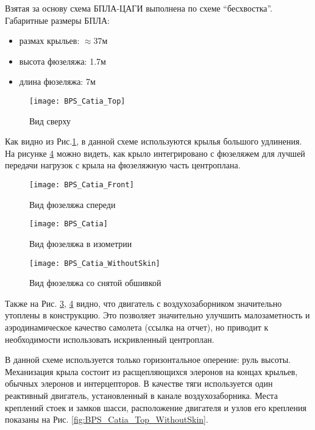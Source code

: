 Взятая за основу схема БПЛА-ЦАГИ выполнена по схеме ``бесхвостка''. Габаритные размеры БПЛА: 
\begin{itemize}
\item размах крыльев: $\approx37\text{м}$
\item высота фюзеляжа: 1.7м
\item длина фюзеляжа: 7м
\end{itemize}


\begin{figure}[H]
\centering
\texttt{[image: BPS\_Catia\_Top]}
\caption{Вид сверху}
\label{fig:BPS_Catia_Top}
\end{figure}

Как видно из Рис.\ref{fig:BPS_Catia_Top}, в данной схеме используются крылья большого удлинения. На рисунке \ref{fig:BPS_Catia_WithoutSkin} можно видеть, как крыло интегрировано с фюзеляжем для лучшей передачи нагрузок с крыла на фюзеляжную часть центроплана.


\begin{figure}[H]
\centering
\texttt{[image: BPS\_Catia\_Front]}
\caption{Вид фюзеляжа спереди}
\label{fig:BPS_Catia_Front}
\end{figure}




\begin{figure}[H]
\centering
\texttt{[image: BPS\_Catia]}
\caption{Вид фюзеляжа в изометрии}
\label{fig:BPS_Catia}
\end{figure}

\begin{figure}[H]
\centering
\texttt{[image: BPS\_Catia\_WithoutSkin]}
\caption{Вид фюзеляжа со снятой обшивкой}
\label{fig:BPS_Catia_WithoutSkin}
\end{figure}

Также на Рис. \ref{fig:BPS_Catia}, \ref{fig:BPS_Catia_WithoutSkin} видно, что двигатель с воздухозаборником значительно утоплены в конструкцию. Это позволяет значительно улучшить малозаметность и аэродинамическое качество самолета (ссылка на отчет), но приводит к необходимости использовать искривленный центроплан. 

В данной схеме используется только горизонтальное оперение: руль высоты. Механизация крыла состоит из расщепляющихся элеронов на концах крыльев, обычных элеронов и интерцепторов. В качестве тяги используется один реактивный двигатель, установленный в канале воздухозаборника. Места креплений стоек и замков шасси, расположение двигателя и узлов его крепления показаны на Рис. \ref{fig:BPS_Catia_Top_WithoutSkin}. 


